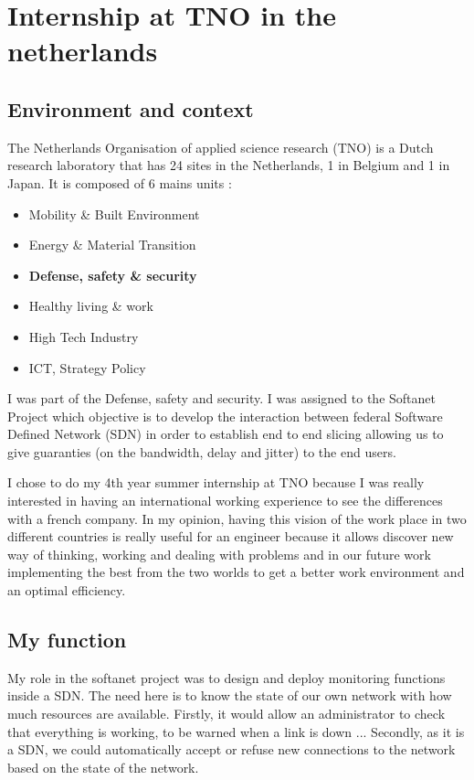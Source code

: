 \section{Internship at TNO in the netherlands}

\subsection{Environment and context}
The Netherlands Organisation of applied science research (TNO) is a Dutch research laboratory
that has 24 sites in the Netherlands, 1 in Belgium and 1 in Japan. It is composed of 6 mains units :
\smallskip

\begin{itemize}
    \item Mobility \& Built Environment
    \item Energy \& Material Transition
    \item \textbf{Defense, safety \& security}
    \item Healthy living  \& work
    \item High Tech Industry
    \item ICT, Strategy Policy
\end{itemize}
\smallskip

I was part of the Defense, safety and security. I was assigned to the Softanet Project which
objective is to develop the interaction between federal Software Defined Network (SDN) in order to
establish end to end slicing allowing us to give guaranties (on the bandwidth, delay and jitter) to
the end users.
\smallskip

I chose to do my 4th year summer internship at TNO because I was really interested in having
an international working experience to see the differences with a french company. In my opinion,
having this vision of the work place in two different countries is really useful for an engineer because
it allows discover new way of thinking, working and dealing with problems and in our future work
implementing the best from the two worlds to get a better work environment and an optimal
efficiency.

\subsection{My function}


My role in the softanet project was to design and deploy monitoring functions inside a SDN.
The need here is to know the state of our own network with how much resources are available.
Firstly, it would allow an administrator to check that everything is working, to be warned when a
link is down ... Secondly, as it is a SDN, we could automatically accept or refuse new connections
to the network based on the state of the network.


